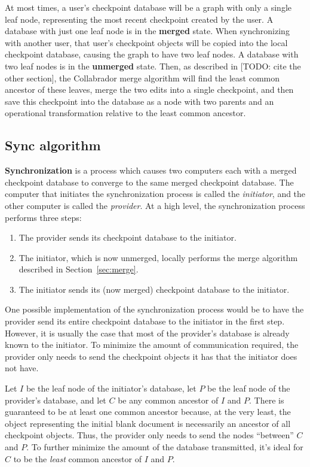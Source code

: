 \documentclass[11pt,titlepage]{article}
\begin{document}
At most times, a user's checkpoint database will be a graph with only a single leaf node, representing the most recent checkpoint created by the user. A database with just one leaf node is in the \textbf{merged} state. When synchronizing with another user, that user's checkpoint objects will be copied into the local checkpoint database, causing the graph to have two leaf nodes. A database with two leaf nodes is in the \textbf{unmerged} state. Then, as described in [TODO: cite the other section], the Collabrador merge algorithm will find the least common ancestor of these leaves, merge the two edits into a single checkpoint, and then save this checkpoint into the database as a node with two parents and an operational transformation relative to the least common ancestor.

\subsection{Sync algorithm}

\textbf{Synchronization} is a process which causes two computers each with a merged checkpoint database to converge to the same merged checkpoint database. The computer that initiates the synchronization process is called the \emph{initiator}, and the other computer is called the \emph{provider}. At a high level, the synchronization process performs three steps:
\begin{enumerate}
\item The provider sends its checkpoint database to the initiator.
\item The initiator, which is now unmerged, locally performs the merge algorithm described in Section~\ref{sec:merge}.
\item The initiator sends its (now merged) checkpoint database to the initiator.
\end{enumerate}
One possible implementation of the synchronization process would be to have the provider send its entire checkpoint database to the initiator in the first step. However, it is usually the case that most of the provider's database is already known to the initiator. To minimize the amount of communication required, the provider only needs to send the checkpoint objects it has that the initiator does not have.

Let $I$ be the leaf node of the initiator's database, let $P$ be the leaf node of the provider's database, and let $C$ be any common ancestor of $I$ and $P$. There is guaranteed to be at least one common ancestor because, at the very least, the object representing the initial blank document is necessarily an ancestor of all checkpoint objects. Thus, the provider only needs to send the nodes ``between'' $C$ and $P$. To further minimize the amount of the database transmitted, it's ideal for $C$ to be the \emph{least} common ancestor of $I$ and $P$.
\end{document}
